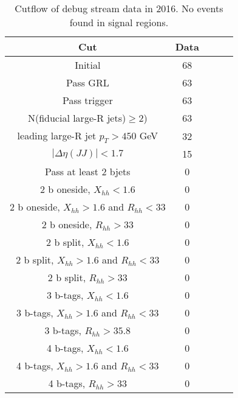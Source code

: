 \begin{table}[htbp!]
\begin{center}
\begin{tabular}{c|c|c|c|c}
Cut & Data \\
\hline
Initial & 68  \\
Pass GRL & 63 \\
Pass trigger & 63 \\
N(fiducial large-R jets)$\geq 2$) & 63 \\
leading large-R jet $p_{T}>450$ GeV & 32 \\
$|\Delta\eta(JJ)|<1.7$ & 15 \\
Pass at least 2 bjets & 0 \\
\hline
2 b oneside, $X_{hh}<1.6$ & 0 \\
2 b oneside, $X_{hh}>1.6$ and $R_{hh}<33$ & 0 \\
2 b oneside, $R_{hh}>33$ & 0 \\
\hline
\hline
2 b split, $X_{hh}<1.6$ & 0 \\
2 b split, $X_{hh}>1.6$ and $R_{hh}<33$ & 0 \\
2 b split, $R_{hh}>33$ & 0 \\
\hline
\hline
3 b-tags, $X_{hh}<1.6$ & 0 \\
3 b-tags, $X_{hh}>1.6$ and $R_{hh}<33$ & 0 \\
3 b-tags, $R_{hh}>35.8$ & 0 \\
\hline
4 b-tags, $X_{hh}<1.6$ & 0 \\
4 b-tags, $X_{hh}>1.6$ and $R_{hh}<33$ & 0 \\
4 b-tags, $R_{hh}>33$ & 0 \\
\hline
\end{tabular}
\end{center}
\caption{Cutflow of debug stream data in 2016. No events found in signal regions.}
\label{tab:boosted-16debug-cutflow}
\end{table}
